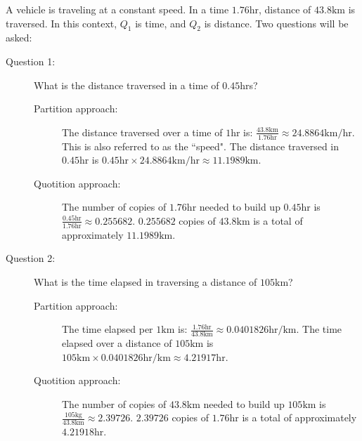 \documentclass{article}
\begin{document}
A vehicle is traveling at a constant speed. In a time \(1.76\text{hr}\), distance of \(43.8\text{km}\) is traversed. In this context, \(Q_1\) is time, and \(Q_2\) is distance. Two questions will be asked:
\begin{description}
\item[Question 1:] What is the distance traversed in a time of \(0.45\text{hr}\)s?
	\begin{description}
	\item[Partition approach:] The distance traversed over a time of \(1\text{hr}\) is: \(\frac{43.8\text{km}}{1.76\text{hr}} \approx 24.8864\text{km/hr}\). This is also referred to as the ``speed". The distance traversed in \(0.45\text{hr}\) is \(0.45\text{hr} \times 24.8864\text{km/hr} \approx 11.1989\text{km}\).
	\item[Quotition approach:] The number of copies of \(1.76\text{hr}\) needed to build up \(0.45\text{hr}\) is \(\frac{0.45\text{hr}}{1.76\text{hr}} \approx 0.255682\). \(0.255682\) copies of \(43.8\text{km}\) is a total of approximately \(11.1989\text{km}\).
	\end{description}
\item[Question 2:] What is the time elapsed in traversing a distance of \(105\text{km}\)?
	\begin{description}
	\item[Partition approach:] The time elapsed per \(1\text{km}\) is: \(\frac{1.76\text{hr}}{43.8\text{km}} \approx 0.0401826\text{hr/km}\). The time elapsed over a distance of \(105\text{km}\) is \(105\text{km} \times 0.0401826\text{hr/km} \approx 4.21917\text{hr}\).
	\item[Quotition approach:] The number of copies of \(43.8\text{km}\) needed to build up \(105\text{km}\) is \(\frac{105\text{kg}}{43.8\text{km}} \approx 2.39726\). \(2.39726\) copies of \(1.76\text{hr}\) is a total of approximately \(4.21918\text{hr}\).
	\end{description}
\end{description}
\end{document}
